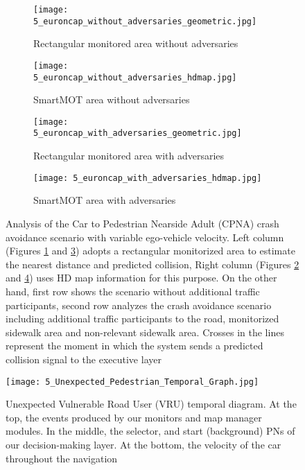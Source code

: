 \begin{figure}[ht]
	\centering
	\begin{subfigure}{0.45\textwidth}
		\texttt{[image: 5\_euroncap\_without\_adversaries\_geometric.jpg]}
		\caption{Rectangular monitored area without adversaries}
		\label{fig:5_euroncap_graphics_a}
	\end{subfigure}
	\hfill
	\begin{subfigure}{0.45\textwidth}
		\texttt{[image: 5\_euroncap\_without\_adversaries\_hdmap.jpg]}
		\caption{SmartMOT area without adversaries}
		\label{fig:5_euroncap_graphics_b}
	\end{subfigure}
	\hfill
	\begin{subfigure}{0.45\textwidth}
		\texttt{[image: 5\_euroncap\_with\_adversaries\_geometric.jpg]}
		\caption{Rectangular monitored area with adversaries}
		\label{fig:5_euroncap_graphics_c}
	\end{subfigure}
	\hfill
	\begin{subfigure}{0.45\textwidth}
		\texttt{[image: 5\_euroncap\_with\_adversaries\_hdmap.jpg]}
		\caption{SmartMOT area with adversaries}
		\label{fig:5_euroncap_graphics_d}
	\end{subfigure}

	\caption[Analysis of the Car to Pedestrian Nearside Adult (CPNA) crash avoidance scenario with variable ego-vehicle velocity]{Analysis of the Car to Pedestrian Nearside Adult (CPNA) crash avoidance scenario with variable ego-vehicle velocity. Left column (Figures \ref{fig:5_euroncap_graphics_a} and \ref{fig:5_euroncap_graphics_c}) adopts a rectangular monitorized area to estimate the nearest distance and predicted collision, Right column (Figures \ref{fig:5_euroncap_graphics_b} and \ref{fig:5_euroncap_graphics_d}) uses HD map information for this purpose. On the other hand, first row shows the scenario without additional traffic participants, second row analyzes the crash avoidance scenario including additional traffic participants to the road, monitorized sidewalk area and non-relevant sidewalk area. Crosses in the lines represent the moment in which the system sends a predicted collision signal to the executive layer}
	\label{fig:5_cpna_results}
\end{figure}

\begin{figure*}[h]
	\centering
	\texttt{[image: 5\_Unexpected\_Pedestrian\_Temporal\_Graph.jpg]}
	\caption[Unexpected Vulnerable Road User (VRU) temporal diagram]{Unexpected Vulnerable Road User (VRU) temporal diagram. At the top, the events produced by our monitors and map manager modules. In the middle, the selector, and start (background) PNs of our decision-making layer. At the bottom, the velocity of the car throughout the navigation}
	\label{fig:5_unexpected_vru}
\end{figure*}

